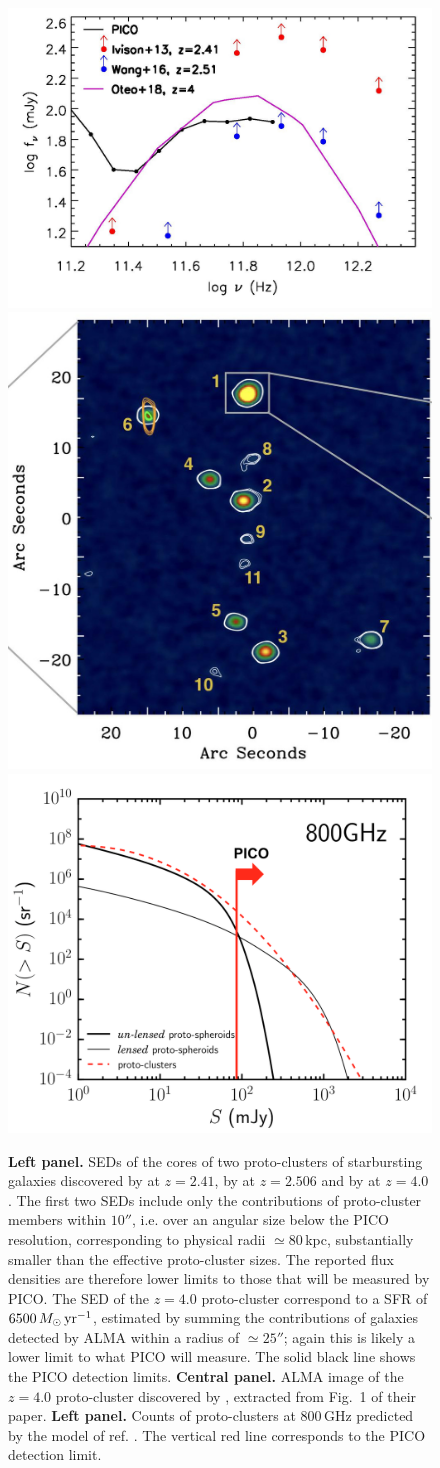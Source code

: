\documentclass[PICOReport.tex]{subfiles}
\begin{document}
\begin{figure}
\begin{center}
\includegraphics[width=0.32\columnwidth, trim={0 0 0 0cm}, clip]{images/fig_protocl_PICO}
\includegraphics[width=0.32\columnwidth, height=3.7truecm, trim={0 0 0 0.cm}, clip]{images/Oteo_2018_protocl.jpg}
\includegraphics[width=0.32\columnwidth, height=3.7truecm, trim={0 0 0 0.cm}, clip]{images/NgtFclumps_800GHz.png}
\caption{\textbf{Left panel.} SEDs of the cores of two proto-clusters of starbursting galaxies
discovered by \cite{Ivison2013} at $z=2.41$, by \cite{Wang2016} at $z=2.506$ and by \cite{Oteo2018}
at $z=4.0$. The first two SEDs include only the contributions of proto-cluster members within $10''$,
i.e. over an angular size below the PICO resolution, corresponding to physical radii $\simeq 80\,$kpc,
substantially smaller than the effective proto-cluster sizes. The reported flux densities are therefore
lower limits to those that will be measured by PICO. The SED of the $z=4.0$ proto-cluster correspond to
a SFR of $6500\,M_\odot\,\hbox{yr}^{-1}$, estimated by \cite{Oteo2018} summing the contributions of
galaxies detected by ALMA within a radius of $\simeq 25''$; again this is likely a lower limit to what
PICO will measure. The solid black line shows the PICO detection limits.
\textbf{Central panel.} ALMA image of the $z=4.0$ proto-cluster discovered by \cite{Oteo2018}, extracted from Fig.~1 of their paper.
\textbf{Left panel.} Counts of proto-clusters at 800\,GHz predicted by the  model of ref. \cite{Negrello2017protocl}.
The vertical red line corresponds to the PICO detection limit.
}
\label{fig:protocluster}
\end{center}
\end{figure}
\end{document}
